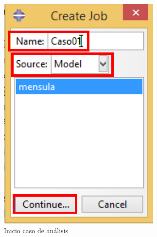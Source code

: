\begin{enumerate}
\begin{figure}[H]
\begin{subfigure}{0.33\textwidth}
      \includegraphics[width=\textwidth]{./body/images/imagen62.pdf}
      \caption{Inicio caso de análisis}
      \label{figu62}
    \end{subfigure}%
    ~ %
    \begin{subfigure}{0.49\textwidth}

\end{subfigure}
\end{figure}
\end{enumerate}
